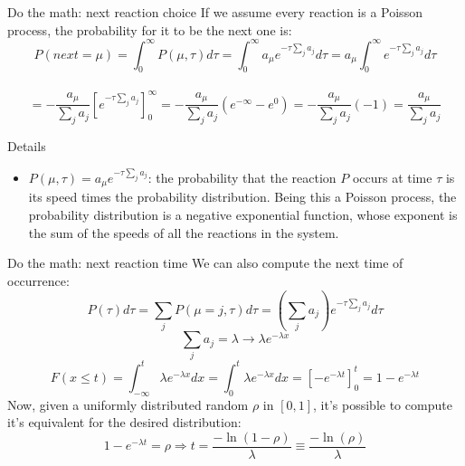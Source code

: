 \documentclass[presentation]{beamer}
\begin{document}
\begin{frame}{Do the math: next reaction choice}
If we assume every reaction is a Poisson process, the probability for it to be the next one is: \\
$$
P(next = \mu)
= \int_0^\infty P(\mu,\tau)d\tau
= \int_0^\infty a_\mu e^{-\tau\sum_j{a_j}}d\tau
= a_\mu \int_0^\infty  e^{-\tau\sum_j{a_j}}d\tau
$$ \\
$$
= -\frac{a_\mu}{\sum_j{a_j}} [e^{-\tau\sum_j{a_j}}]_0^\infty
= -\frac{a_\mu}{\sum_j{a_j}} (e^{-\infty} - e^{0})
= -\frac{a_\mu}{\sum_j{a_j}} (-1)
= \frac{a_\mu}{\sum_j{a_j}}$$
\begin{block}{Details}
 \begin{itemize}
  \item $P(\mu,\tau) = a_\mu e^{-\tau\sum_j{a_j}}$: the probability that the reaction $P$ occurs at time $\tau$ is its speed times the probability distribution. Being this a Poisson process, the probability distribution is a negative exponential function, whose exponent is the sum of the speeds of all the reactions in the system.
 \end{itemize}
\end{block}
\end{frame}

\begin{frame}{Do the math: next reaction time}
We can also compute the next time of occurrence:
$$P(\tau)d\tau = \sum_j P(\mu = j,\tau)d\tau = \left(\sum_j{a_j}\right) e^{-\tau\sum_j{a_j}}d\tau $$
$$ \sum_j{a_j} = \lambda \longrightarrow \lambda e^{-\lambda x}$$
$$F(x\leq t) = \int_{-\infty}^t \lambda e^{-\lambda x} dx = \int_{0}^t \lambda e^{-\lambda x} dx = \left[-e^{-\lambda t}\right]_{0}^t = 1 - e^{-\lambda t}$$
Now, given a uniformly distributed random $\rho$ in $\left[0,1 \right]$, it's possible to compute it's equivalent for the desired distribution:
$$ 1 - e^{-\lambda t} = \rho \Rightarrow t = \frac{-\ln \left( 1 - \rho \right)}{\lambda} \equiv \frac{-\ln \left(\rho \right)}{\lambda}$$
\end{frame}
\end{document}
